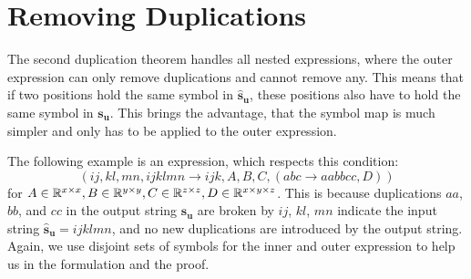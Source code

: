 \section{Removing Duplications}

The second duplication theorem handles all nested expressions, where the outer expression can only remove duplications and cannot remove any.
This means that if two positions hold the same symbol in $\bm{\hat{s}_u}$, these positions also have to hold the same symbol in $\bm{s_u}$.
This brings the advantage, that the symbol map is much simpler and only has to be applied to the outer expression.

The following example is an expression, which respects this condition:
$$(ij, kl, mn, ijklmn \rightarrow ijk, A, B, C, (abc \rightarrow aabbcc, D))$$
for $A \in \mathbb{R}^{x \times x}, B \in \mathbb{R}^{y \times y}, C \in \mathbb{R}^{z \times z}, D \in \mathbb{R}^{x \times y \times z}$.
This is because duplications $aa$, $bb$, and $cc$ in the output string $\bm{s_u}$ are broken by $ij$, $kl$, $mn$ indicate the input string $\bm{\hat{s}_u} = ijklmn$, and no new duplications are introduced by the output string.
Again, we use disjoint sets of symbols for the inner and outer expression to help us in the formulation and the proof.

